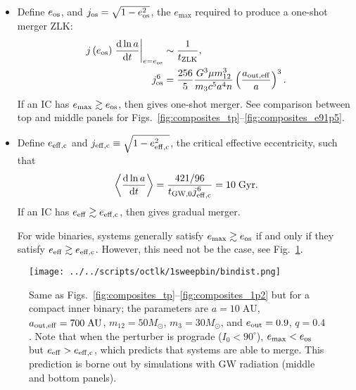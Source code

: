 \documentclass[
        fleqn,
        usenatbib,
    ]{mnras}
\newcommand*{\rd}[2]{\frac{\mathrm{d}#1}{\mathrm{d}#2}}
\newcommand*{\at}[1]{\left.#1\right|}
\newcommand*{\ev}[1]{\left\langle#1\right\rangle}
\newcommand*{\p}[1]{\left(#1\right)}
\newlength{\colummwidth}
\begin{document}
\begin{itemize}
    \item Define $e_{\rm os}$, and $j_{\rm os} = \sqrt{1 - e_{\rm os}^2}$, the
        $e_{\max}$ required to produce a one-shot merger ZLK\@:
        \begin{align}
            j\p{e_{\rm os}}\at{\rd{\ln a}{t}}_{e = e_{\rm os}} &\sim
                \frac{1}{t_{\rm ZLK}},\\
            j_{\rm os}^6
                &= \frac{256}{5}\frac{G^3 \mu m_{12}^3}{m_3c^5a^4n}
                    \p{\frac{a_{\rm out, eff}}{a}}^3.
                    \label{eq:def_e_os}
        \end{align}
        If an IC has $e_{\max} \gtrsim e_{\rm os}$, then gives one-shot merger.
        See comparison between top and middle panels for
        Figs.~\ref{fig:composites_tp}--\ref{fig:composites_e91p5}.

    \item Define $e_{\rm eff, c}$ and $j_{\rm eff, c} \equiv \sqrt{1 - e_{\rm
        eff, c}^2}$, the critical effective eccentricity, such that
        \begin{equation}
            \ev{\rd{\ln a}{t}} = \frac{421/96}{t_{\rm GW, 0}j_{\rm eff, c}^6}
                = 10\;\mathrm{Gyr}.
                \label{eq:def_e_eff_c}
        \end{equation}
        If an IC has $e_{\rm eff} \gtrsim e_{\rm eff, c}$, then gives gradual
        merger.

        For wide binaries, systems generally satisfy $e_{\max} \gtrsim e_{\rm
        os}$ if and only if they satisfy $e_{\rm eff} \gtrsim e_{\rm eff, c}$.
        However, this need not be the case, see
        Fig.~\ref{fig:composite_bindist}.
\end{itemize}
\begin{figure}
    \centering
    \texttt{[image: ../../scripts/octlk/1sweepbin/bindist.png]}
    \caption{Same as Figs.~\ref{fig:composites_tp}--\ref{fig:composites_1p2}
    but for a compact inner binary; the parameters are $a = 10\;\mathrm{AU}$,
    $a_{\rm out, eff} = 700\;\mathrm{AU}$, $m_{12} = 50M_{\odot}$, $m_3 =
    30M_{\odot}$, and $e_{\rm out} = 0.9$, $q = 0.4$. Note that when the
    perturber is prograde ($I_0 < 90^\circ$), $e_{\max} <
    e_{\rm os}$ but $e_{\rm eff} > e_{\rm eff, c}$, which predicts that systems
    are able to merge. This prediction is borne out by simulations with GW
    radiation (middle and bottom panels). }\label{fig:composite_bindist}
\end{figure}
\end{document}
